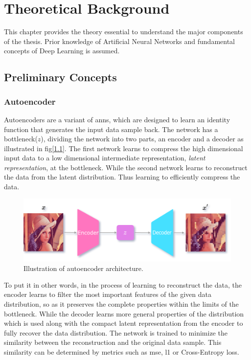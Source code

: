 \chapter{Theoretical Background}
\label{chap:background}

This chapter provides the theory essential to understand the major components of the thesis. Prior knowledge of Artificial Neural Networks \cite{theory_ann_wiki} and fundamental concepts of Deep Learning \cite{theory_dl} is assumed.

\section{Preliminary Concepts}
\label{sec:Preliminary}

\subsection{Autoencoder}
Autoencoders are a variant of \acp{ann}, which are designed to learn an identity function that generates the input data sample back. The network has a bottleneck($z$), dividing the network into two parts, an encoder and a decoder as illustrated in fig[\ref{fig:ae_arch}]. The first network learns to compress the high dimensional input data to a low dimensional intermediate representation, \textit{latent representation}, at the bottleneck. While the second network learns to reconstruct the data from the latent distribution. Thus learning to efficiently compress the data.

\begin{figure}[!h]
    \centering
    \includegraphics[scale=0.4]{figures/ae_arch.png}
    \caption{Illustration of autoencoder architecture.}
    \label{fig:ae_arch}
\end{figure}

To put it in other words, in the process of learning to reconstruct the data, the encoder learns to filter the most important features of the given data distribution, so as it preserves the complete properties within the limits of the bottleneck. While the decoder learns more general properties of the distribution which is used along with the compact latent representation from the encoder to fully recover the data distribution. The network is trained to minimize the similarity between the reconstruction and the original data sample. This similarity can be determined by metrics such as \ac{mse}, \ac{l1} or Cross-Entropy loss.

